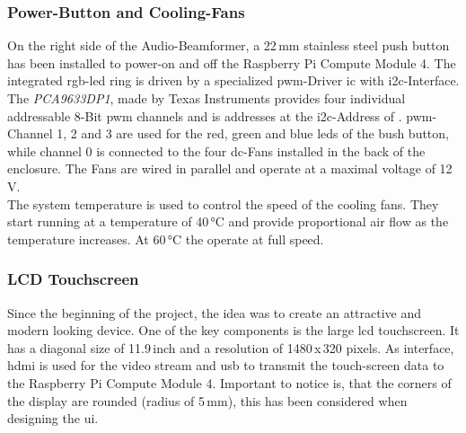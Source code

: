 \subsubsection{Power-Button and Cooling-Fans}
On the right side of the Audio-Beamformer, a 22\,mm stainless steel push button has been installed to power-on and off the Raspberry Pi Compute Module 4. The integrated \acrshort{rgb}-\acrshort{led} ring is driven by a specialized \acrshort{pwm}-Driver \acrshort{ic} with \acrshort{i2c}-Interface. The \textit{PCA9633DP1}, made by Texas Instruments provides four individual addressable 8-Bit \acrshort{pwm} channels and is addresses at the \acrshort{i2c}-Address of . \acrshort{pwm}-Channel 1, 2 and 3 are used for the red, green and blue \acrshort{led}s of the bush button, while channel 0 is connected to the four \acrshort{dc}-Fans installed in the back of the enclosure. The Fans are wired in parallel and operate at a maximal voltage of 12\,V.\\
The system temperature is used to control the speed of the cooling fans. They start running at a temperature of 40\,°C and provide proportional air flow as the temperature increases. At 60\,°C the operate at full speed.

\subsubsection{LCD Touchscreen}
Since the beginning of the project, the idea was to create an attractive and modern looking device. One of the key components is the large \acrshort{lcd} touchscreen. It has a diagonal size of 11.9\,inch and a resolution of 1480\,x\,320 pixels. As interface, \acrshort{hdmi} is used for the video stream and \acrshort{usb} to transmit the touch-screen data to the Raspberry Pi Compute Module 4. Important to notice is, that the corners of the display are rounded (radius of 5\,mm), this has been considered when designing the \acrlong{ui}.

